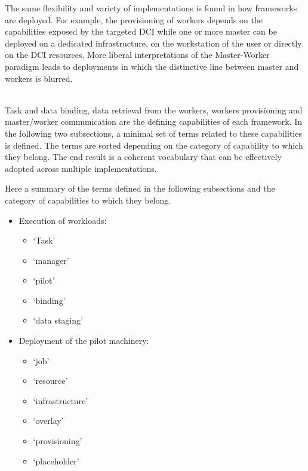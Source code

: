 \documentclass{sig-alternate}
\begin{document}
The same flexibility and variety of implementations is found in how
\pilotjob frameworks are deployed. For example, the provisioning of
workers depends on the capabilities exposed by the targeted DCI while
one or more master can be deployed on a dedicated infrastructure, on the
workstation of the user or directly on the DCI resources.
 More liberal interpretations of the Master-Worker
paradigm leads to deployments in which the distinctive line between
master and workers is blurred.  

\\
Task and data binding, data retrieval from the workers, workers
provisioning and master/worker communication are the defining
capabilities of each \pilotjob framework.  In the following two
subsections, a minimal set of terms related to these capabilities is
defined. The terms are sorted depending on the category of capability
to which they belong. The end result is a coherent vocabulary that can
be effectively adopted across multiple \pilotjob implementations.




 Here a summary of the terms defined in the following
subsections and the category of capabilities to which they belong.

\begin{itemize}
  \item Execution of workloads:
  \begin{itemize}
    \item `Task'
    \item `manager'
    \item `pilot'
    \item `binding'
    \item `data staging'
  \end{itemize}
  \item Deployment of the pilot machinery:
  \begin{itemize}
    \item `job'
    \item `resource'
    \item `infrastructure'
    \item `overlay'
    \item `provisioning'
    \item `placeholder'
  \end{itemize}
\end{itemize}
\end{document}
